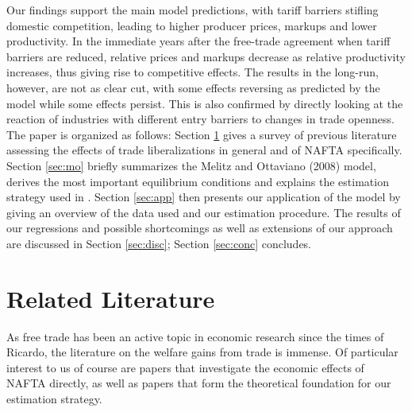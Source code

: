 \documentclass[a4paper,12pt]{article}
\begin{document}
Our findings support the main model predictions, with tariff barriers stifling domestic competition, leading to higher producer prices, markups and lower productivity. In the immediate years after the free-trade agreement when tariff barriers are reduced, relative prices and markups decrease as relative productivity increases, thus giving rise to competitive effects. The results in the long-run, however, are not as clear cut, with some effects reversing as predicted by the model while some effects persist. This is also confirmed by directly looking at the reaction of industries with different entry barriers to changes in trade openness.  
\vspace{0.5cm}
The paper is organized as follows: Section \ref{sec:lit} gives a survey of previous literature assessing the effects of trade liberalizations in general and of NAFTA specifically. Section \ref{sec:mo} briefly summarizes the Melitz and Ottaviano (2008) model, derives the most important equilibrium conditions and explains the estimation strategy used in \citet{Chen2009}. Section \ref{sec:app} then presents our application of the model by giving an overview of the data used and our estimation procedure. The results of our regressions and possible shortcomings as well as extensions of our approach are discussed in Section \ref{sec:disc}; Section \ref{sec:conc} concludes.

\newpage


\section{Related Literature}\label{sec:lit}

As free trade has been an active topic in economic research since the times of Ricardo, the literature on the welfare gains from trade is immense. Of particular interest to us of course are papers that investigate the economic effects of NAFTA directly, as well as papers that form the theoretical foundation for our estimation strategy.
\end{document}
